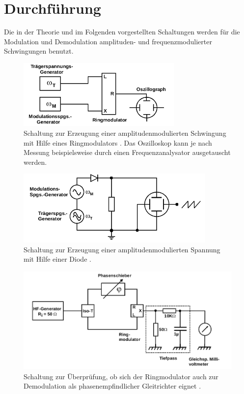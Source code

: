  \section{Durchführung}
\label{sec:Durchführung}

Die in der Theorie und im Folgenden vorgestellten Schaltungen werden für die Modulation und
Demodulation amplituden- und frequenzmodulierter Schwingungen benutzt.

\begin{figure}[H]
  \centering
  \includegraphics[height=3.4cm]{JasperErsterSchultag/expab.png}
  \caption{Schaltung zur Erzeugung einer amplitudenmodulierten Schwingung mit Hilfe eines Ringmodulators \cite{anleitung}.
  Das Oszilloskop kann je nach Messung beispielsweise durch einen Frequenzanalysator ausgetauscht werden.}
  \label{fig:expab}
\end{figure}

\begin{figure}[H]
  \centering
  \includegraphics[height=3.7cm]{JasperErsterSchultag/expc.png}
  \caption{Schaltung zur Erzeugung einer amplitudenmodulierten Spannung mit Hilfe einer Diode \cite{anleitung}.}
  \label{fig:expc}
\end{figure}

\begin{figure}[H]
  \centering
  \includegraphics[height=5.3cm]{JasperErsterSchultag/expef.png}
  \caption{Schaltung zur Überprüfung, ob sich der Ringmodulator auch zur Demodulation als
  phasenempfindlicher Gleitrichter eignet \cite{anleitung}.}
  \label{fig:expef}
\end{figure}

